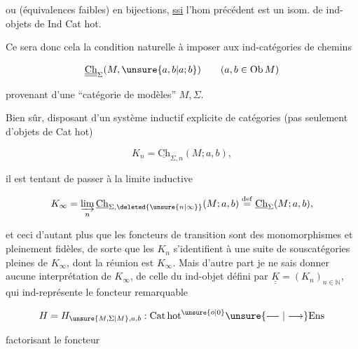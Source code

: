 
ou  (équivalences faibles) en bijections, \uline{ssi} l'hom précédent est un isom. de ind-objets de Ind Cat hot.

Ce sera donc cela la condition naturelle à imposer aux  ind-catégories de chemins

\[
 \underline{\underline{\mathrm{Ch}}}_{\Sigma}(M,\unsure{a,b|a;b})
 \qquad(a,b\in\mathrm{Ob}\,M)
\]

provenant d'une ``catégorie de modèles'' $M,\Sigma$.

Bien sûr, disposant d'un système inductif explicite de catégories (pas seulement d'objets de Cat hot)

\[
 K_n=\underline{\mathrm{Ch}}_{\Sigma,n}(M;a,b),
\]

il est tentant de passer à la limite inductive

\[
 K_\infty=\varinjlim_n\underline{\mathrm{Ch}}_{\Sigma,\deleted{\unsure{n|\infty}}}(M;a,b)
 \overset{\mathrm{def}}{=}\underline{\mathrm{Ch}}_\Sigma(M;a,b),
\]

et ceci d'autant plus que les foncteurs de transition sont des monomorphismes et pleinement fidèles, de sorte que  les $K_n$ s'identifient à une suite de souscatégories pleines de $K_\infty$, dont la réunion est $K_\infty$. Mais d'autre part je ne sais donner aucune interprétation  de $K_\infty$,   de celle du ind-objet  défini par $\underline{\underline K}=(K_n)_{n\in\mathbb N}$, qui ind-représente le foncteur remarquable

\[
 H=H_{\unsure{M,\Sigma|M},a,b}:\mathrm{Cat\,hot}^{\unsure{o|0}}
 \unsure{\relbar\joinrel\relbar|\longrightarrow}\mathrm{Ens}
\]

factorisant le foncteur

